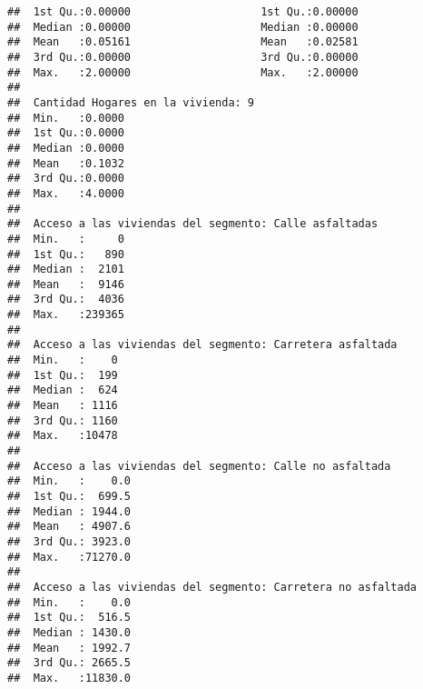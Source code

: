 \documentclass[11pt,]{article}
\begin{document}
\begin{verbatim}
##  1st Qu.:0.00000                    1st Qu.:0.00000                   
##  Median :0.00000                    Median :0.00000                   
##  Mean   :0.05161                    Mean   :0.02581                   
##  3rd Qu.:0.00000                    3rd Qu.:0.00000                   
##  Max.   :2.00000                    Max.   :2.00000                   
##                                                                       
##  Cantidad Hogares en la vivienda: 9
##  Min.   :0.0000                    
##  1st Qu.:0.0000                    
##  Median :0.0000                    
##  Mean   :0.1032                    
##  3rd Qu.:0.0000                    
##  Max.   :4.0000                    
##                                    
##  Acceso a las viviendas del segmento: Calle asfaltadas
##  Min.   :     0                                       
##  1st Qu.:   890                                       
##  Median :  2101                                       
##  Mean   :  9146                                       
##  3rd Qu.:  4036                                       
##  Max.   :239365                                       
##                                                       
##  Acceso a las viviendas del segmento: Carretera asfaltada
##  Min.   :    0                                           
##  1st Qu.:  199                                           
##  Median :  624                                           
##  Mean   : 1116                                           
##  3rd Qu.: 1160                                           
##  Max.   :10478                                           
##                                                          
##  Acceso a las viviendas del segmento: Calle no asfaltada
##  Min.   :    0.0                                        
##  1st Qu.:  699.5                                        
##  Median : 1944.0                                        
##  Mean   : 4907.6                                        
##  3rd Qu.: 3923.0                                        
##  Max.   :71270.0                                        
##                                                         
##  Acceso a las viviendas del segmento: Carretera no asfaltada
##  Min.   :    0.0                                            
##  1st Qu.:  516.5                                            
##  Median : 1430.0                                            
##  Mean   : 1992.7                                            
##  3rd Qu.: 2665.5                                            
##  Max.   :11830.0                                            

\end{verbatim}
\end{document}
